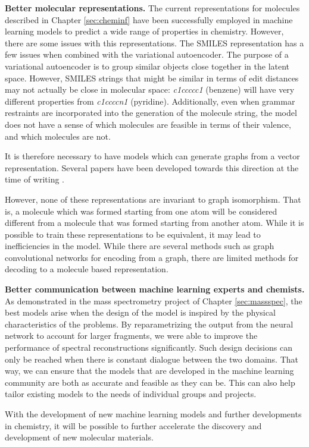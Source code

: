 \textbf{Better molecular representations.}
The current representations for molecules described in Chapter \ref{sec:cheminf} have been successfully employed in machine learning models
to predict a wide range of properties in chemistry.
However, there are some issues with this representations.
The SMILES representation has a few issues when combined with the variational autoencoder.
The purpose of a variational autoencoder is to group similar objects close together in the latent space.
However, SMILES strings that might be similar in terms of edit distances may not actually be close in molecular space:
\textit{c1ccccc1} (benzene) will have very different properties from \textit{c1ccccn1} (pyridine).
Additionally, even when grammar restraints are incorporated into the generation of the molecule string\cite{kusner2017grammar},
the model does not have a sense of which molecules are feasible in terms of their valence, and which molecules are not.

It is therefore necessary to have models which can generate graphs from a vector representation.
Several papers have been developed towards this direction at the time of writing
\cite{Ma2018Constrained,Liu2018Constrained,You2018GraphConvPolicy,jin2018junction}.

However, none of these representations are invariant to graph isomorphism. That is, a molecule which was
formed starting from one atom will be considered different from a molecule that was formed starting from another atom.
While it is possible to train these representations to be equivalent, it may lead to inefficiencies in the model.
While there are several methods such as graph convolutional networks for encoding from a graph,
there are limited methods for decoding to a molecule based representation.

\textbf{Better communication between machine learning experts and chemists.}
As demonstrated in the mass spectrometry project of Chapter \ref{sec:massspec},
the best models arise when the design of the model is inspired by the physical characteristics of the problems.
By reparametrizing the output from the neural network to account for larger fragments, we were able to improve the
performance of spectral reconstructions significantly.
Such design decisions can only be reached when there is constant dialogue between the two domains.
That way, we can ensure that the models that are developed in the machine learning community are both as accurate
and feasible as they can be.
This can also help tailor existing models to the needs of individual groups and projects.

With the development of new machine learning models and further developments in chemistry,
it will be possible to further accelerate the discovery and development of new molecular materials.
